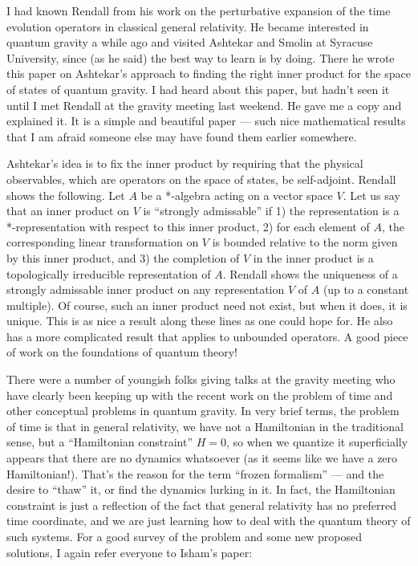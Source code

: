 \documentclass[12pt]{article}
\def\tightlist{}
\renewcommand{\texttt}[1]{%
  \begingroup
  \ttfamily
  \begingroup\lccode`~=`/\lowercase{\endgroup\def~}{/\discretionary{}{}{}}%
  \begingroup\lccode`~=`[\lowercase{\endgroup\def~}{[\discretionary{}{}{}}%
  \begingroup\lccode`~=`.\lowercase{\endgroup\def~}{.\discretionary{}{}{}}%
  \catcode`/=\active\catcode`[=\active\catcode`.=\active
  \scantokens{#1\noexpand}%
  \endgroup
}
\begin{document}
I had known Rendall from his work on the perturbative expansion of the
time evolution operators in classical general relativity. He became
interested in quantum gravity a while ago and visited Ashtekar and
Smolin at Syracuse University, since (as he said) the best way to learn
is by doing. There he wrote this paper on Ashtekar's approach to finding
the right inner product for the space of states of quantum gravity. I
had heard about this paper, but hadn't seen it until I met Rendall at
the gravity meeting last weekend. He gave me a copy and explained it. It
is a simple and beautiful paper --- such nice mathematical results that
I am afraid someone else may have found them earlier somewhere.

Ashtekar's idea is to fix the inner product by requiring that the
physical observables, which are operators on the space of states, be
self-adjoint. Rendall shows the following. Let \(A\) be a *-algebra
acting on a vector space \(V\). Let us say that an inner product on
\(V\) is ``strongly admissable'' if 1) the representation is a
*-representation with respect to this inner product, 2) for each element
of \(A\), the corresponding linear transformation on \(V\) is bounded
relative to the norm given by this inner product, and 3) the completion
of \(V\) in the inner product is a topologically irreducible
representation of \(A\). Rendall shows the uniqueness of a strongly
admissable inner product on any representation \(V\) of \(A\) (up to a
constant multiple). Of course, such an inner product need not exist, but
when it does, it is unique. This is as nice a result along these lines
as one could hope for. He also has a more complicated result that
applies to unbounded operators. A good piece of work on the foundations
of quantum theory!


There were a number of youngish folks giving talks at the gravity
meeting who have clearly been keeping up with the recent work on the
problem of time and other conceptual problems in quantum gravity. In
very brief terms, the problem of time is that in general relativity, we
have not a Hamiltonian in the traditional sense, but a ``Hamiltonian
constraint'' \(H = 0\), so when we quantize it superficially appears
that there are no dynamics whatsoever (as it seems like we have a zero
Hamiltonian!). That's the reason for the term ``frozen formalism'' ---
and the desire to ``thaw'' it, or find the dynamics lurking in it. In
fact, the Hamiltonian constraint is just a reflection of the fact that
general relativity has no preferred time coordinate, and we are just
learning how to deal with the quantum theory of such systems. For a good
survey of the problem and some new proposed solutions, I again refer
everyone to Isham's paper:
\end{document}
